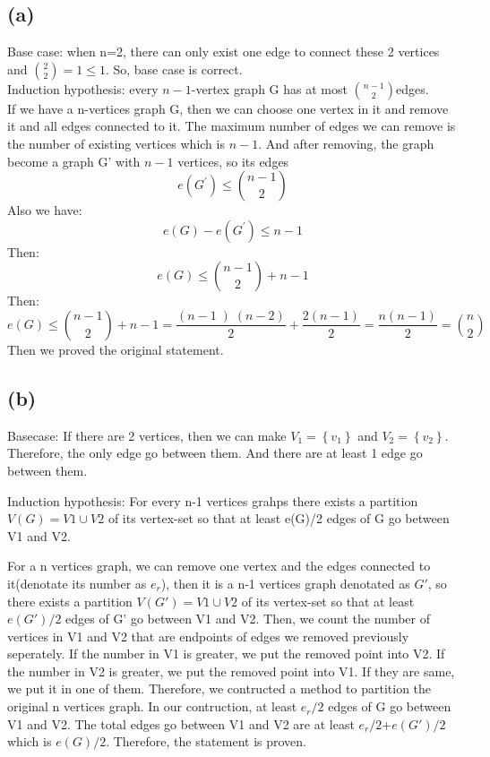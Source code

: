 \documentclass[11pt]{article}
\begin{document}
\subsection*{(a)}
Base case: when n=2, there can only exist one edge to connect these 2 vertices and $\binom22 =1\le1$. So, base case is correct.\\
Induction hypothesis: every $n-1$-vertex graph G has at most $ \binom{n-1}{2} $edges. \\
If we have a n-vertices graph G, then we can choose one vertex in it and remove it and all edges connected to it. The maximum number of edges we can remove is the number of existing vertices which is $n-1$. And after removing, the graph become a graph G' with $n-1$ vertices, so its edges 
$$ e\left(G^{\prime}\right)\le\binom{n-1}{2} $$
Also we have:
$$ e\left(G\right)-e\left(G^{\prime}\right)\le n-1 $$
Then:$$ e\left(G\right)\le{}\binom{n-1}{2}+n-1 $$
Then:
$$ e\left(G\right)\le{}\binom{n-1}{2}+n-1=\frac{\left(n-1\left)\left(n-2\right.\right.\right)}{2}+\frac{2\left(n-1\right)}{2}=\frac{n\left(n-1\right)}{2}=\binom{n}{2} $$
Then we proved the original statement.

\subsection*{(b)}

Basecase: If there are 2 vertices, then we can make $ V_1=\left\lbrace v_1\right\rbrace$ and $V_2=\left\lbrace v_2\right\rbrace$. Therefore, the only edge go between them. And there are at least 1 edge go between them.

Induction hypothesis: For every n-1 vertices grahps there exists a partition $ V(G)=V1\cup V2 $ of its vertex-set so that at least e(G)/2 edges of G go between V1 and V2.

For a n vertices graph, we can remove one vertex and the edges connected to it(denotate its number as $e_r$), then it is a n-1 vertices graph denotated as $G'$, so there exists a partition $ V(G')=V1\cup V2 $ of its vertex-set so that at least $e(G')/2 $ edges of G' go between V1 and V2. Then, we count the number of vertices in V1 and V2 that are endpoints of edges we removed previously seperately. If the number in V1 is greater, we put the removed point into V2. If the number in V2 is greater, we put the removed point into V1. If they are same, we put it in one of them. Therefore, we contructed a method to partition the original n vertices graph. In our contruction, at least $e_r/2$ edges of G go between V1 and V2. The total edges go between V1 and V2 are at least $e_r/2$+$e(G')/2$ which is $e(G)/2$. Therefore, the statement is proven. 
\end{document}
